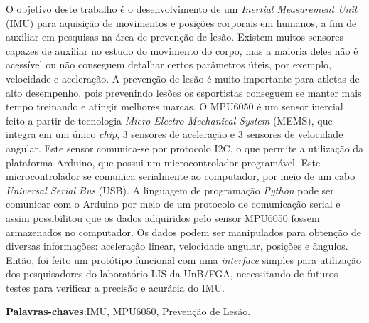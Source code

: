 \begin{resumo}
 
 \noindent
 O objetivo deste trabalho é o desenvolvimento de um \textit{Inertial Measurement Unit} (IMU) para aquisição de movimentos e posições corporais em humanos, a fim de auxiliar em pesquisas na área de prevenção de lesão. Existem muitos sensores capazes de auxiliar no estudo do movimento do corpo, mas a maioria deles não é acessível ou não conseguem detalhar certos parâmetros úteis, por exemplo, velocidade e aceleração. A prevenção de lesão é muito importante para atletas de alto desempenho, pois prevenindo lesões os esportistas conseguem se manter mais tempo treinando e atingir melhores marcas. O MPU6050 é um sensor inercial feito a partir de tecnologia \textit{Micro Electro Mechanical System} (MEMS), que integra em um único \textit{chip}, 3 sensores de aceleração e 3 sensores de velocidade angular. Este sensor comunica-se por protocolo I2C, o que permite a utilização da plataforma Arduino, que possui um microcontrolador programável. Este microcontrolador se comunica serialmente ao computador, por meio de um cabo \textit{Universal  Serial Bus} (USB). A linguagem de programação \textit{Python} pode ser comunicar com o Arduino por meio de um protocolo de comunicação serial e assim possibilitou que os dados adquiridos pelo sensor MPU6050 fossem armazenados no computador. Os dados podem ser manipulados para obtenção de diversas informações: aceleração linear, velocidade angular, posições e ângulos. Então, foi feito um protótipo funcional com uma \textit{interface} simples para utilização dos pesquisadores do laboratório LIS da UnB/FGA, necessitando de futuros testes para verificar a precisão e acurácia do IMU. 
 
 \vspace{\onelineskip}
 \textbf{Palavras-chaves}:IMU, MPU6050, Prevenção de Lesão.
\end{resumo}
